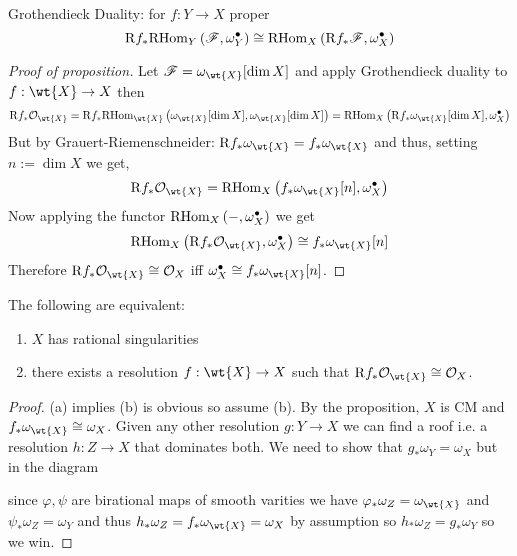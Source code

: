 \documentclass[12pt]{article}
\newcommand{\R}{\mathrm{R}}
\begin{document}
Grothendieck Duality: for $f : Y \to X$ proper
\[ \R f_* \RHom{Y}{\F}{\omega_Y^\bullet} \cong \RHom{X}{\R f_* \F}{\omega_X^\bullet} \] 
 
\begin{proof}[Proof of proposition]
Let $\F = \omega_{\wt{X}}[\dim{X}]$ and apply Grothendieck duality to $f : \wt{X} \to X$ then 
\[ \R f_* \struct{\wt{X}} = \R f_* \RHom{\wt{X}}{\omega_{\wt{X}}[\dim{X}]}{\omega_{\wt{X}}[\dim{X}]} = \RHom{X}{\R f_* \omega_{\wt{X}}[\dim{X}]}{\omega_X^\bullet} \]
But by Grauert-Riemenschneider: $\R f_* \omega_{\wt{X}} = f_* \omega_{\wt{X}}$ and thus, setting $n := \dim{X}$ we get,
\[ \R f_* \struct{\wt{X}} = \RHom{X}{f_* \omega_{\wt{X}}[n]}{\omega_X^\bullet} \]
Now applying the functor $\mathrm{RHom}_{X} \left( -, \omega_X^\bullet \right)$ we get 
\[ \RHom{X}{\R f_* \struct{\wt{X}}}{\omega_X^\bullet} \cong f_* \omega_{\wt{X}}[n] \]
Therefore $\R f_* \struct{\wt{X}} \cong \struct{X}$ iff $\omega_X^\bullet \cong f_* \omega_{\wt{X}}[n]$. 
\end{proof}
 
 
\begin{cor}
The following are equivalent:
\begin{enumerate}
\item $X$ has rational singularities
\item there exists a resolution $f : \wt{X} \to X$ such that $\R f_* \struct{\wt{X}} \cong \struct{X}$. 
\end{enumerate}
\end{cor}

\begin{proof}
(a) implies (b) is obvious so assume (b). By the proposition, $X$ is CM and $f_* \omega_{\wt{X}} \cong \omega_X$. Given any other resolution $g : Y \to X$ we can find a roof i.e. a resolution $h : Z \to X$ that dominates both. We need to show that $g_* \omega_Y = \omega_X$ but in the diagram
\begin{center}
\end{center}
since $\varphi, \psi$ are birational maps of smooth varities we have $\varphi_* \omega_Z = \omega_{\wt{X}}$ and $\psi_* \omega_Z = \omega_Y$ and thus $h_* \omega_Z = f_* \omega_{\wt{X}} = \omega_X$ by assumption so $h_* \omega_Z = g_* \omega_Y$ so we win. 
\end{proof}
\end{document}
